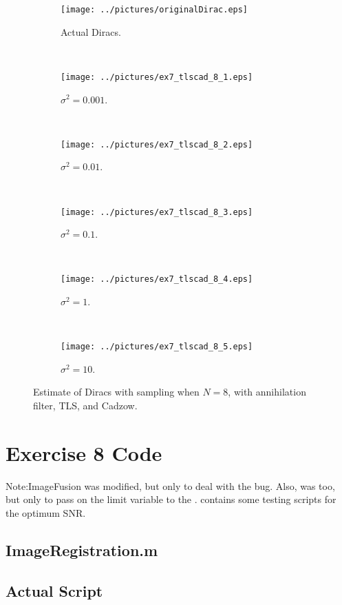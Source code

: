 \documentclass[11pt,a4paper]{report}
\begin{document}
\begin{figure}[H]
    \captionsetup[subfigure]{position=b}
    \centering
    \begin{subfigure}{0.49\textwidth}
        \texttt{[image: ../pictures/originalDirac.eps]}
        \caption{Actual Diracs.}
        \label{fig:ex7_tlscad_8_0}
    \end{subfigure}
    ~
    \begin{subfigure}{0.49\textwidth}
        \texttt{[image: ../pictures/ex7\_tlscad\_8\_1.eps]}
        \caption{$\sigma^2 = 0.001$.}
        \label{fig:ex7_tlscad_8_1}
    \end{subfigure}
    \\
    \begin{subfigure}{0.49\textwidth}
        \texttt{[image: ../pictures/ex7\_tlscad\_8\_2.eps]}
        \caption{$\sigma^2 = 0.01$.}
        \label{fig:ex7_tlscad_8_2}
    \end{subfigure}
    ~
    \begin{subfigure}{0.49\textwidth}
        \texttt{[image: ../pictures/ex7\_tlscad\_8\_3.eps]}
        \caption{$\sigma^2 = 0.1$.}
        \label{fig:ex7_tlscad_8_3}
    \end{subfigure}
    \\
    \begin{subfigure}{0.49\textwidth}
        \texttt{[image: ../pictures/ex7\_tlscad\_8\_4.eps]}
        \caption{$\sigma^2 = 1$.}
        \label{fig:ex7_tlscad_8_4}
    \end{subfigure}
    ~
    \begin{subfigure}{0.49\textwidth}
        \texttt{[image: ../pictures/ex7\_tlscad\_8\_5.eps]}
        \caption{$\sigma^2 = 10$.}
        \label{fig:ex7_tlscad_8_5}
    \end{subfigure}

    \caption{Estimate of Diracs with sampling when $N = 8$, with annihilation filter, TLS, and Cadzow.}
    \label{fig:ex7_tlscad_8}
\end{figure}

\newpage
\section{Exercise 8 Code}
Note:ImageFusion was modified, but only to deal with the  bug. Also,  was too, but only to pass on the limit variable to the .  contains some testing scripts for the optimum SNR.
\subsection{ImageRegistration.m}

\newpage

\subsection{Actual Script}

\end{document}
